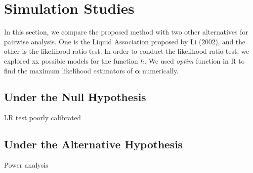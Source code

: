 \documentclass[12pt]{article}
\theoremstyle{theorem}
\begin{document}
\section{Simulation Studies}
In this section, we compare the proposed method with two other alternatives for pairwise analysis. One is the Liquid Association proposed by Li (2002), \cite{li2002genome} and the other is the likelihood ratio test. In order to conduct the likelihood ratio test, we explored xx possible models for the function $h$. We used \textit{optim} function in R to find the maximum likelihood estimators of $\bm{\alpha}$ numerically. 

\subsection{Under the Null Hypothesis}

LR test poorly calibrated

\subsection{Under the Alternative Hypothesis}

Power analysis

\end{document}
